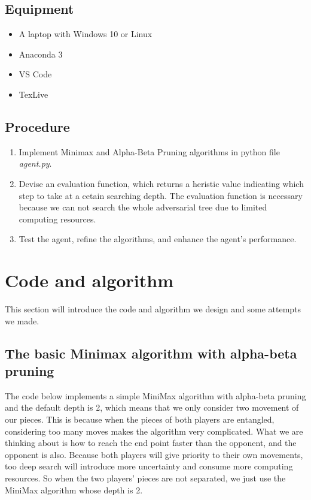 \documentclass[aps,letterpaper,10pt]{article}
\begin{document}
\subsection{Equipment}
	\begin{itemize}
		\item A laptop with Windows 10 or Linux
		\item Anaconda 3
		\item VS Code 
		\item TexLive
	\end{itemize}

\subsection{Procedure}
\begin{enumerate}
\item Implement Minimax and Alpha-Beta Pruning algorithms in python file {\itshape agent.py}.
\item Devise an evaluation function, which returns a heristic value indicating which step to take at a cetain searching depth. The evaluation function is necessary because we can not search the whole adversarial tree due to limited computing resources. 
\item Test the agent, refine the algorithms, and enhance the agent's performance.
\end{enumerate}

\newpage
\section{Code and algorithm}
This section will introduce the code and algorithm we design and some attempts we made.
\vspace{3mm}



\subsection{The basic Minimax algorithm with alpha-beta pruning}

The code below implements a simple MiniMax algorithm with alpha-beta pruning and the default depth is 2, which means that we only consider two movement of our pieces.
This is because when the pieces of both players are entangled, considering too many moves makes the algorithm very complicated. 
What we are thinking about is how to reach the end point faster than the opponent, and the opponent is also.
Because both players will give priority to their own movements, too deep search will introduce more uncertainty and consume more computing resources.
So when the two players’ pieces are not separated, we just use the MiniMax algorithm whose depth is 2.
\end{document}
